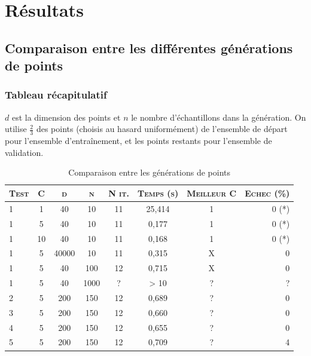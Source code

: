 \documentclass{article}
\begin{document}
\section{Résultats}

\subsection{Comparaison entre les différentes générations de points}

\subsubsection{Tableau récapitulatif}

$d$ est la dimension des points et $n$ le nombre d'échantillons dans la génération. On utilise $\frac{2}{3}$ des points (choisis au hasard uniformément) de l'ensemble de départ pour l'ensemble d'entraînement, et les points restants pour l'ensemble de validation. \\

     \begin{table}[H]
       \caption{Comparaison entre les générations de points}
       \begin{tabular}{|l|c|c|c|c|c|c|r|}
         \hline
         \textsc{Test} & \textsc{C} & \textsc{d} & \textsc{n} & \textsc{N it.} & \textsc{Temps (s)} & \textsc{Meilleur C} & \textsc{Echec (\%)}\\
         \hline
         1 & 1 & 40 & 10 & 11 & 25,414 & 1 & 0 (*)\\
         \hline
         1 & 5 & 40 & 10 & 11 & 0,177 & 1 & 0 (*)\\
         \hline
         1 & 10 & 40 & 10 & 11 & 0,168 & 1 & 0 (*)\\
         \hline
         1 & 5 & 40000 & 10 & 11 & 0,315 & X & 0\\
         \hline
         1 & 5 & 40 & 100 & 12 & 0,715 & X & 0\\
         \hline
         1 & 5 & 40 & 1000 & ? & > 10 & ? & ?\\
         \hline
         2 & 5 & 200 & 150 & 12 & 0,689 & ? & 0\\
         \hline
         3 & 5 & 200 & 150 & 12 & 0,660 & ? & 0\\
         \hline
         4 & 5 & 200 & 150 & 12 & 0,655 & ? & 0\\
         \hline
         5 & 5 & 200 & 150 & 12 & 0,709 & ? & 4\\
         \hline
       \end{tabular}
     \end{table}
\end{document}
